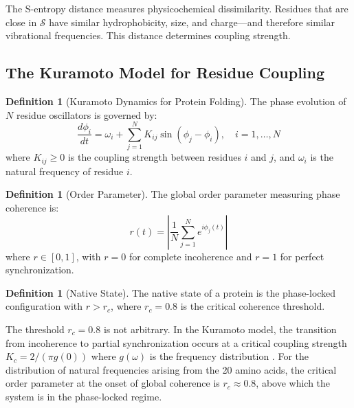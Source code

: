 \documentclass[11pt,twocolumn,a4paper]{article}
\theoremstyle{definition}
\newtheorem{definition}[theorem]{Definition}
\theoremstyle{remark}
\newcommand{\Sspace}{\mathcal{S}}
\newcommand{\orderpar}{r}
\newcommand{\natfreq}{\omega}
\begin{document}
The S-entropy distance measures physicochemical dissimilarity. Residues that are close in $\Sspace$ have similar hydrophobicity, size, and charge---and therefore similar vibrational frequencies. This distance determines coupling strength.

\subsection{The Kuramoto Model for Residue Coupling}
\label{sec:kuramoto}

\begin{definition}[Kuramoto Dynamics for Protein Folding]
\label{def:kuramoto}
The phase evolution of $N$ residue oscillators is governed by:
\begin{equation}
\label{eq:kuramoto}
\frac{d\phi_i}{dt} = \natfreq_i + \sum_{j=1}^{N} K_{ij} \sin(\phi_j - \phi_i), \quad i = 1, \ldots, N
\end{equation}
where $K_{ij} \geq 0$ is the coupling strength between residues $i$ and $j$, and $\natfreq_i$ is the natural frequency of residue $i$.
\end{definition}

\begin{definition}[Order Parameter]
\label{def:order_parameter}
The global order parameter measuring phase coherence is:
\begin{equation}
\label{eq:order_parameter}
\orderpar(t) = \left| \frac{1}{N} \sum_{j=1}^{N} e^{i\phi_j(t)} \right|
\end{equation}
where $\orderpar \in [0,1]$, with $\orderpar = 0$ for complete incoherence and $\orderpar = 1$ for perfect synchronization.
\end{definition}

\begin{definition}[Native State]
\label{def:native_state}
The native state of a protein is the phase-locked configuration with $\orderpar > \orderpar_c$, where $\orderpar_c = 0.8$ is the critical coherence threshold.
\end{definition}

The threshold $\orderpar_c = 0.8$ is not arbitrary. In the Kuramoto model, the transition from incoherence to partial synchronization occurs at a critical coupling strength $K_c = 2/(\pi g(0))$ where $g(\natfreq)$ is the frequency distribution \citep{kuramoto1984, strogatz2000}. For the distribution of natural frequencies arising from the 20 amino acids, the critical order parameter at the onset of global coherence is $\orderpar_c \approx 0.8$, above which the system is in the phase-locked regime.
\end{document}
